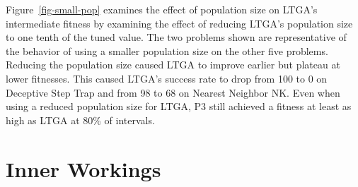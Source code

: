 \documentclass[twoside]{article}
\begin{document}
Figure~\ref{fig-small-pop} examines the effect of population size on LTGA's intermediate fitness by examining the effect
of reducing LTGA's population size to one tenth of the tuned value. The two problems shown are representative of the behavior of using
a smaller population size on the other five problems. Reducing the population size caused LTGA to improve earlier but plateau
at lower fitnesses. This caused LTGA's success rate to drop from 100 to 0 on Deceptive Step Trap and from 98 to 68 on Nearest
Neighbor NK.
Even when using a reduced population size for LTGA, P3 still achieved a fitness at
least as high as LTGA at 80\% of intervals.


\begin{comment}
It is important to note that hBOA and LTGA were tuned specifically
to find the global optimum and are not necessarily using the optimal population size for finding intermediate fitnesses. Consider
that for both reducing the population size would almost certainly improve their fitness for evaluation steps less than their population
size. To examine the effect of population size we tested LTGA using one tenth of the population size required for reliably finding the
global optimum, with the results given in Figure~\ref{fig-small-pop}.
Reducing the population size resulted in LTGA's initial fitness improvement
occurring earlier, as the first generation is completed much more quickly. On Deceptive Step Trap this means that
LTGA leaps ahead of P3 due to its ability to overcome the two bit fitness plateaus.
%
Across all tested problems using the smaller
population size reduced the quality of LTGA's first fitness plateau, likely due to missing required diversity to reach higher quality.
The second period of improvement also comes earlier and reaches a lower quality fitness. On Deceptive Step Trap 0
runs reach the global optimum, down from 100 successful for the full population size. On Nearest Neighbor NK this drops the number
of successful runs from 98 to 68. As a result we conclude that while reducing the population size of LTGA may improve its quality
at early points during optimization, doing so reduces the robustness of the final solution found. This is in contrast to P3
which balances high quality intermediate fitness without trading away eventual optimality.
\end{comment}

\section{Inner Workings}
\end{document}
